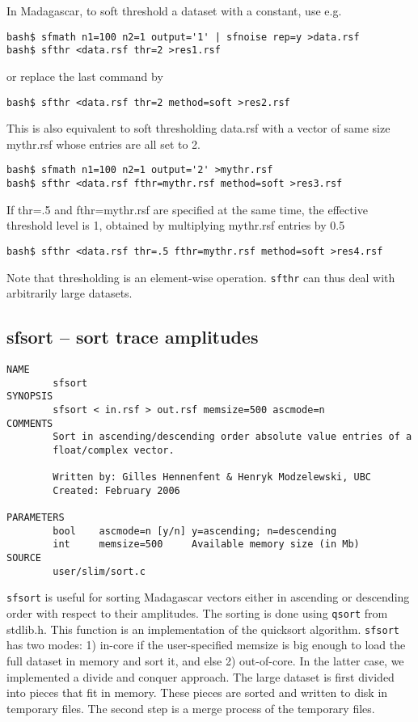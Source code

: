 In Madagascar, to soft threshold a dataset with a constant, use e.g.
%
\begin{verbatim}
bash$ sfmath n1=100 n2=1 output='1' | sfnoise rep=y >data.rsf
bash$ sfthr <data.rsf thr=2 >res1.rsf
\end{verbatim}
%
or replace the last command by
%
\begin{verbatim}
bash$ sfthr <data.rsf thr=2 method=soft >res2.rsf
\end{verbatim}
%
This is also equivalent to soft thresholding data.rsf with a vector of
same size mythr.rsf whose entries are all set to 2.
%
\begin{verbatim}
bash$ sfmath n1=100 n2=1 output='2' >mythr.rsf
bash$ sfthr <data.rsf fthr=mythr.rsf method=soft >res3.rsf
\end{verbatim}
%
If thr=.5 and fthr=mythr.rsf are specified at the same time, the
effective threshold level is 1, obtained by multiplying mythr.rsf
entries by 0.5
%
\begin{verbatim}
bash$ sfthr <data.rsf thr=.5 fthr=mythr.rsf method=soft >res4.rsf
\end{verbatim}


Note that thresholding is an element-wise operation. \texttt{sfthr}
can thus deal with arbitrarily large datasets.
%
\newpage
\subsection{sfsort -- sort trace amplitudes}

\begin{verbatim}
NAME
        sfsort
SYNOPSIS
        sfsort < in.rsf > out.rsf memsize=500 ascmode=n
COMMENTS
        Sort in ascending/descending order absolute value entries of a
        float/complex vector.
        
        Written by: Gilles Hennenfent & Henryk Modzelewski, UBC
        Created: February 2006
        
PARAMETERS
        bool    ascmode=n [y/n] y=ascending; n=descending 
        int     memsize=500     Available memory size (in Mb)
SOURCE
        user/slim/sort.c
\end{verbatim}

\noindent
\texttt{sfsort} is useful for sorting Madagascar vectors either in
ascending or descending order with respect to their amplitudes. The
sorting is done using \texttt{qsort} from stdlib.h.  This function is
an implementation of the quicksort algorithm. \texttt{sfsort} has two
modes: 1) in-core if the user-specified memsize is big enough to load
the full dataset in memory and sort it, and else 2) out-of-core. In
the latter case, we implemented a divide and conquer approach. The
large dataset is first divided into pieces that fit in memory. These
pieces are sorted and written to disk in temporary files. The second
step is a merge process of the temporary files.


